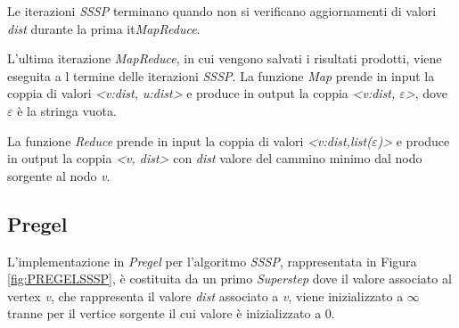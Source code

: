 \documentclass[LaM,binding=0.6cm]{sapthesis}
\begin{document}
Le iterazioni \textit{SSSP} terminano quando non si verificano aggiornamenti di valori \textit{dist} durante la  prima it\textit{MapReduce}.

\begin{minipage}{\linewidth}
		
\end{minipage}

\begin{minipage}{\linewidth}
		
\end{minipage}

L'ultima iterazione \textit{MapReduce}, in cui vengono salvati i risultati prodotti, viene eseguita a l termine  delle iterazioni \textit{SSSP}.
La funzione \textit{Map} prende in input la coppia di valori \textit{<v:dist, u:dist>}  e produce in output la coppia \textit{<v:dist, $\varepsilon$>}, dove $\varepsilon$ è la stringa vuota.

La funzione \textit{Reduce} prende in input la coppia di valori \textit{<v:dist,list($\varepsilon$)>} e produce in output la coppia \textit{<v, dist>} con \textit{dist} valore del cammino minimo dal nodo sorgente al nodo \textit{v}.


\begin{minipage}{\linewidth}
		
\end{minipage}
\begin{minipage}{\linewidth}

\end{minipage}		

\subsection{Pregel}

L'implementazione in \textit{Pregel} per l'algoritmo \textit{SSSP}, rappresentata in Figura \ref{fig:PREGELSSSP}, è costituita da un primo \textit{Superstep} dove il valore associato al vertex \textit{v},  che rappresenta il valore \textit{dist} associato a \textit{v}, viene inizializzato a $\infty$ tranne per il vertice sorgente il cui valore è inizializzato a 0.
\end{document}
